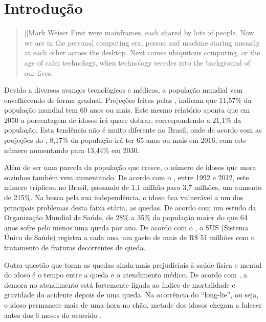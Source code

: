 \chapter{Introdução}
\label{cap:introducao}

\begin{quotation}[]{Mark Weiser}
First were mainframes, each shared by lots of people. Now we are in the personal computing era, person and machine staring uneasily at each other across the desktop. Next comes ubiquitous computing, or the age of calm technology, when technology recedes into the background of our lives. 






\end{quotation}

Devido a diversos avanços tecnológicos e médicos, a população mundial vem envelhecendo de forma gradual. Projeções feitas pelas \cite{unPopulation:13}, indicam que 11,57\% da população mundial tem 60 anos ou mais. Este mesmo relatório aponta que em 2050 a porcentagem de idosos irá quase dobrar, correspondendo a 21,1\% da população. Esta tendência não é muito diferente no Brasil, onde de acordo com as projeções do \cite{ibgePopulation:16}, 8,17\% da população irá ter 65 anos ou mais em 2016, com este número aumentando para 13,44\% em 2030.

Além de ser uma parcela da população que cresce, o número de idosos que mora sozinhos também vem aumentando. De acordo com o \cite{PNAD:12}, entre 1992 e 2012,  este número triplicou no Brasil, passando de 1,1 milhão para 3,7 milhões, um aumento de 215\%. Na busca pela sua independência, o idoso fica vulnerável a um dos principais problemas desta faixa etária, as quedas. De acordo com um estudo da Organização Mundial de Saúde,  de 28\% a 35\% da população maior do que 64 anos sofre pelo menos uma queda por ano. De acordo com o \cite{portalBrasilQuedas:12}, o SUS (Sistema Único de Saúde) registra a cada ano, um gasto de mais de R\$ 51 milhões com o tratamento de fraturas decorrentes de queda.

Outra questão que torna as quedas ainda mais prejudiciais à saúde física e mental do idoso é o tempo entre a queda e o  atendimento médico. De acordo com \cite{bookFallOlderPeople:01}, a demora no atendimento está fortemente ligada ao índice de mortalidade e gravidade do acidente depois de uma queda. Na ocorrência do “long-lie”, ou seja, o idoso permanece mais de uma hora no chão,  metade dos idosos chegam a falecer antes dos 6 meses do ocorrido \citep{wild1981dangerous}.

